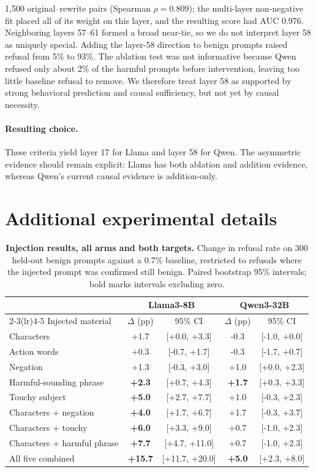 \documentclass{article}
\begin{document}
1{,}500 original--rewrite pairs (Spearman \(\rho=0.809\)); the multi-layer non-negative fit placed all of its weight on this layer, and the resulting score had AUC 0.976. Neighboring layers 57--61 formed a broad near-tie, so we do not interpret layer 58 as uniquely special. Adding the layer-58 direction to benign prompts raised refusal from 5\% to 93\%. The ablation test was not informative because Qwen refused only about 2\% of the harmful prompts before intervention, leaving too little baseline refusal to remove. We therefore treat layer 58 as supported by strong behavioral prediction and causal sufficiency, but not yet by causal necessity. \paragraph{Resulting choice.} These criteria yield layer 17 for Llama and layer 58 for Qwen. The asymmetric evidence should remain explicit: Llama has both ablation and addition evidence, whereas Qwen's current causal evidence is addition-only.\section{Additional experimental details}

\begin{table}[t]
\centering\small
\caption{\textbf{Injection results, all arms and both targets.} Change in refusal rate on 300 held-out benign prompts against a 0.7\% baseline, restricted to refusals where the injected prompt was confirmed still benign. Paired bootstrap 95\% intervals; bold marks intervals excluding zero.}
\label{tab:injection-full}
\begin{tabular}{lcccc}
\toprule
& \multicolumn{2}{c}{Llama3-8B} & \multicolumn{2}{c}{Qwen3-32B} \\
\cmidrule(lr){2-3}\cmidrule(lr){4-5}
Injected material & $\Delta$ (pp) & 95\% CI & $\Delta$ (pp) & 95\% CI \\
\midrule
Characters & +1.7 & [+0.0, +3.3] & -0.3 & [-1.0, +0.0] \\
Action words & +0.3 & [-0.7, +1.7] & -0.3 & [-1.7, +0.7] \\
Negation & +1.3 & [-0.3, +3.0] & +1.0 & [+0.0, +2.3] \\
Harmful-sounding phrase & \textbf{+2.3} & [+0.7, +4.3] & \textbf{+1.7} & [+0.3, +3.3] \\
Touchy subject & \textbf{+5.0} & [+2.7, +7.7] & +1.0 & [-0.3, +2.3] \\
\midrule
Characters + negation & \textbf{+4.0} & [+1.7, +6.7] & +1.7 & [-0.3, +3.7] \\
Characters + touchy & \textbf{+6.0} & [+3.3, +9.0] & +0.7 & [-1.0, +2.3] \\
Characters + harmful phrase & \textbf{+7.7} & [+4.7, +11.0] & +0.7 & [-1.0, +2.3] \\
All five combined & \textbf{+15.7} & [+11.7, +20.0] & \textbf{+5.0} & [+2.3, +8.0] \\
\bottomrule
\end{tabular}
\end{table}
\end{document}
